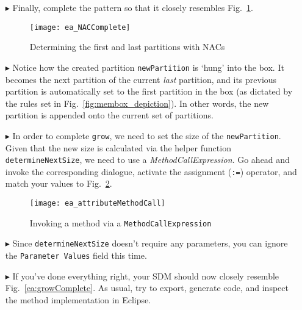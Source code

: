 \begin{itemize}
\item[$\blacktriangleright$] Finally, complete the pattern so that it closely resembles Fig.~\ref{ea:sdm_firstLastPartitions}. 

\begin{figure}[htbp]
\begin{center}
  \texttt{[image: ea\_NACComplete]} 
  \caption{Determining the first and last partitions with NACs}  
  \label{ea:sdm_firstLastPartitions}
\end{center}
\end{figure}
 
\item[$\blacktriangleright$] Notice how the created partition \texttt{newPartition} is `hung' into the box. It becomes the next partition of the current
\emph{last} partition, and its previous partition is automatically set to the first partition in the box (as dictated by the rules set in
Fig.~\ref{fig:membox_depiction}). In other words, the new partition is appended onto the current set of partitions.

\item[$\blacktriangleright$] In order to complete \texttt{grow}, we need to set the size of the \texttt{newPartition}. Given that the new size is calculated
via the helper function \texttt{det\-er\-mine\-Next\-Size}, we need to use a \emph{MethodCallExpression}. Go ahead and invoke the corresponding dialogue,
activate the assignment (\texttt{:=}) operator, and match your values to Fig.~\ref{ea:sdm_methodCallExpr}.
 
\begin{figure}[htbp]
\begin{center}
  \texttt{[image: ea\_attributeMethodCall]}
  \caption{Invoking a method via a \texttt{MethodCallExpression}}  
  \label{ea:sdm_methodCallExpr} 
\end{center}
\end{figure}

\item[$\blacktriangleright$] Since \texttt{determineNextSize} doesn't require any parameters, you can ignore the \texttt{Parameter Values} field this time. 

\vspace{0.5cm}

\item[$\blacktriangleright$] If you've done everything right, your SDM should now closely resemble Fig.~\ref{ea:growComplete}. As usual, try to export,
generate code, and inspect the method implementation in Eclipse.


\end{itemize}

